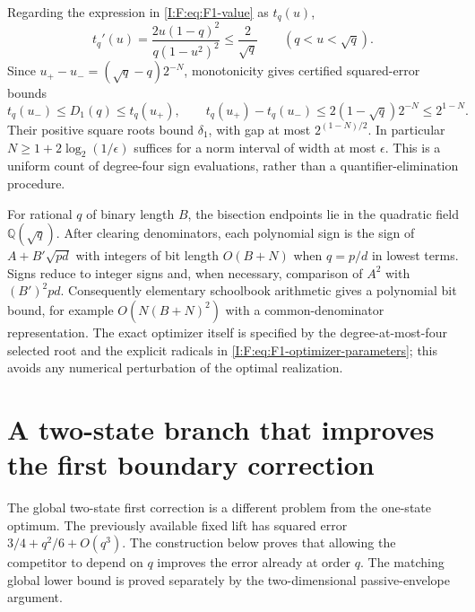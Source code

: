Regarding the expression in \eqref{I:F:eq:F1-value} as $t_q(u)$,
\[
 t_q'(u)=\frac{2u(1-q)^2}{q(1-u^2)^2}\le\frac2{\sqrt q}
 \qquad(q<u<\sqrt q).
\]
Since $u_+-u_-=(\sqrt q-q)2^{-N}$, monotonicity gives certified
squared-error bounds
\[
 t_q(u_-)\le D_1(q)\le t_q(u_+),\qquad
 t_q(u_+)-t_q(u_-)\le2(1-\sqrt q)2^{-N}\le2^{1-N}.
\]
Their positive square roots bound $\delta_1$, with gap at most
$2^{(1-N)/2}$. In particular $N\ge1+2\log_2(1/\epsilon)$ suffices
for a norm interval of width at most $\epsilon$. This is a uniform
count of degree-four sign evaluations, rather than a quantifier-elimination
procedure.

For rational $q$ of binary length $B$, the bisection endpoints lie in the
quadratic field $\mathbb Q(\sqrt q)$. After clearing denominators, each
polynomial sign is the sign of $A+B'\sqrt{pd}$ with integers of bit length
$O(B+N)$ when $q=p/d$ in lowest terms. Signs reduce to integer signs and,
when necessary, comparison of $A^2$ with $(B')^2pd$. Consequently elementary
schoolbook arithmetic gives a polynomial bit bound, for example
$O(N(B+N)^2)$ with a common-denominator representation. The exact optimizer
itself is specified by the degree-at-most-four selected root and the
explicit radicals in \eqref{I:F:eq:F1-optimizer-parameters}; this avoids any
numerical perturbation of the optimal realization.

\section{A two-state branch that improves the first boundary correction}
\label{I:F:sec:f2}

The global two-state first correction is a different problem from the
one-state optimum. The previously available fixed lift has squared error
$3/4+q^2/6+O(q^3)$. The construction below proves that allowing the
competitor to depend on $q$ improves the error already at order $q$.
The matching global lower bound is proved separately by the two-dimensional passive-envelope argument.


